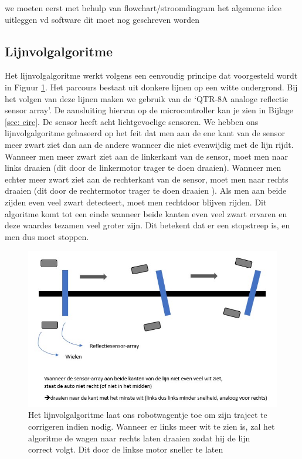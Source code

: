 \documentclass[a4paper,twoside,kulak]{kulakreport}
\begin{document}
we moeten eerst met behulp van flowchart/stroomdiagram het algemene idee uitleggen vd software
dit moet nog geschreven worden

\subsection{Lijnvolgalgoritme}
Het lijnvolgalgoritme werkt volgens een eenvoudig principe dat voorgesteld wordt in Figuur \ref{fig: lijnvolg}.
Het parcours bestaat uit donkere lijnen op een witte ondergrond. Bij het volgen van deze lijnen maken we gebruik van de `QTR-8A analoge reflectie sensor array'.
De aansluiting hiervan op de microcontroller kan je zien in Bijlage \ref{sec: circ}. De sensor heeft acht lichtgevoelige sensoren. We hebben ons lijnvolgalgoritme gebaseerd op het feit dat men aan de ene kant van de sensor meer zwart ziet dan aan de andere wanneer die niet evenwijdig met de lijn rijdt. Wanneer men meer zwart ziet aan de linkerkant van de sensor, moet men naar links draaien (dit door de linkermotor trager te doen draaien). Wanneer men echter meer zwart ziet aan de rechterkant van de sensor, moet men naar rechts draaien (dit door de rechtermotor trager te doen draaien ). Als men aan beide zijden even veel zwart detecteert, moet men rechtdoor blijven rijden. Dit algoritme komt tot een einde wanneer beide kanten even veel zwart ervaren en deze waardes tezamen veel groter zijn. Dit betekent dat er een stopstreep is, en men dus moet stoppen. 

\begin{figure}
	\centering
	\includegraphics[width=.84\textwidth]{pref2}
	\caption{Het lijnvolgalgoritme laat ons robotwagentje toe om zijn traject te corrigeren indien nodig. Wanneer er links meer wit te zien is, zal het algoritme de wagen naar rechts laten draaien zodat hij de lijn correct volgt. Dit door de linkse motor sneller te laten  }
	\label{fig: lijnvolg}
	
\end{figure}
\end{document}
